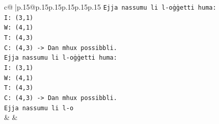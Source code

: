 \documentclass{article}
\begin{document}
{\begin{supertabular}{c@{$\;$}|p{.15\linewidth}@{}p{.15\linewidth}p{.15\linewidth}p{.15\linewidth}p{.15\linewidth}p{.15\linewidth}}
{{{\texttt{Ejja nassumu li l{-}oġġetti huma:} \\
\texttt{I: (3,1)} \\
\texttt{W: (4,1)} \\
\texttt{T: (4,3)} \\
\texttt{C: (4,3) {-}> Dan mhux possibbli.} \\
\texttt{Ejja nassumu li l{-}oġġetti huma:} \\
\texttt{I: (3,1)} \\
\texttt{W: (4,1)} \\
\texttt{T: (4,3)} \\
\texttt{C: (4,3) {-}> Dan mhux possibbli.} \\
\texttt{Ejja nassumu li l{-}o} \\
            }
        }
    }
    & & \\ \\


\end{supertabular}}
\end{document}
